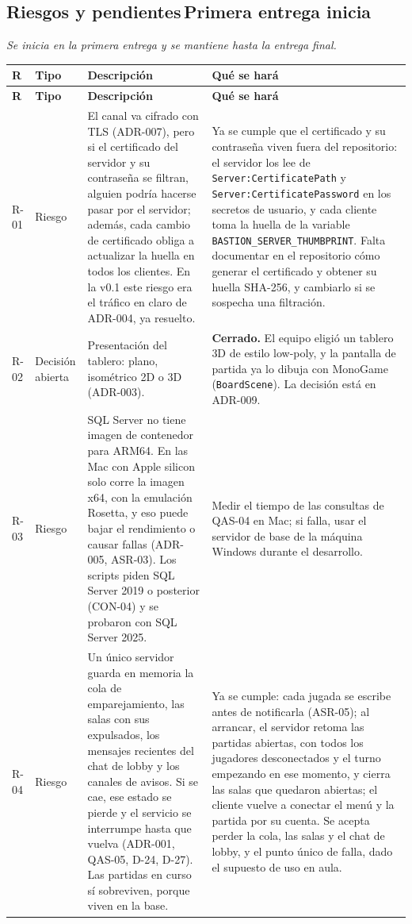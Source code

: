 \documentclass[11pt,letterpaper]{article}
\newcommand{\hint}[1]{{\itshape\color{black!70}#1}\par} %
\newcommand{\bluebadge}[1]{\hspace{0.8em}\colorbox{SADBlueBg}{\scriptsize\bfseries\color{SADBlue}\,#1\,}}
\newcommand{\hd}[1]{\textbf{\small #1}}
\newcommand{\headrow}{\rowcolor{SADHead}}
\begin{document}
\subsection{Riesgos y pendientes\bluebadge{Primera entrega inicia}}
\hint{Se inicia en la primera entrega y se mantiene hasta la entrega final.}
\begin{xltabular}{\linewidth}{|p{1.4cm}|p{2.8cm}|Y|Y|}\hline
  \headrow\hd{R} & \hd{Tipo} & \hd{Descripción} & \hd{Qué se hará}\\\hline
  \endfirsthead
  \headrow\hd{R} & \hd{Tipo} & \hd{Descripción} & \hd{Qué se hará}\\\hline
  \endhead
  R-01 & Riesgo & El canal va cifrado con TLS (ADR-007), pero si el certificado del servidor y su contraseña se filtran, alguien podría hacerse pasar por el servidor; además, cada cambio de certificado obliga a actualizar la huella en todos los clientes. En la v0.1 este riesgo era el tráfico en claro de ADR-004, ya resuelto. & Ya se cumple que el certificado y su contraseña viven fuera del repositorio: el servidor los lee de \texttt{Server:\allowbreak CertificatePath} y \texttt{Server:\allowbreak CertificatePassword} en los secretos de usuario, y cada cliente toma la huella de la variable \texttt{BASTION\_\allowbreak SERVER\_\allowbreak THUMBPRINT}. Falta documentar en el repositorio cómo generar el certificado y obtener su huella SHA-256, y cambiarlo si se sospecha una filtración.\\\hline
  R-02 & Decisión abierta & Presentación del tablero: plano, isométrico 2D o 3D (ADR-003). & \textbf{Cerrado.} El equipo eligió un tablero 3D de estilo low-poly, y la pantalla de partida ya lo dibuja con MonoGame (\texttt{BoardScene}). La decisión está en ADR-009.\\\hline
  R-03 & Riesgo & SQL Server no tiene imagen de contenedor para ARM64. En las Mac con Apple silicon solo corre la imagen x64, con la emulación Rosetta, y eso puede bajar el rendimiento o causar fallas (ADR-005, ASR-03). Los scripts piden SQL Server 2019 o posterior (CON-04) y se probaron con SQL Server 2025. & Medir el tiempo de las consultas de QAS-04 en Mac; si falla, usar el servidor de base de la máquina Windows durante el desarrollo.\\\hline
  R-04 & Riesgo & Un único servidor guarda en memoria la cola de emparejamiento, las salas con sus expulsados, los mensajes recientes del chat de lobby y los canales de avisos. Si se cae, ese estado se pierde y el servicio se interrumpe hasta que vuelva (ADR-001, QAS-05, D-24, D-27). Las partidas en curso sí sobreviven, porque viven en la base. & Ya se cumple: cada jugada se escribe antes de notificarla (ASR-05); al arrancar, el servidor retoma las partidas abiertas, con todos los jugadores desconectados y el turno empezando en ese momento, y cierra las salas que quedaron abiertas; el cliente vuelve a conectar el menú y la partida por su cuenta. Se acepta perder la cola, las salas y el chat de lobby, y el punto único de falla, dado el supuesto de uso en aula.\\\hline

\end{xltabular}
\end{document}
